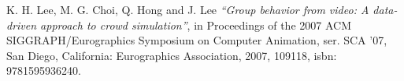 \documentclass{standalone}
\begin{document}
\begin{thebibliography}{99}
K. H. Lee, M. G. Choi, Q. Hong and J. Lee
  \textit{“Group behavior from video: A data-driven approach to crowd simulation”}, 
in Proceedings of the 2007 ACM SIGGRAPH/Eurographics Symposium on Computer Animation, 
ser. SCA ’07, San Diego, California: Eurographics Association, 2007, 109118, 
isbn: 9781595936240.


















\end{thebibliography}


\printbibliography
\end{document}
